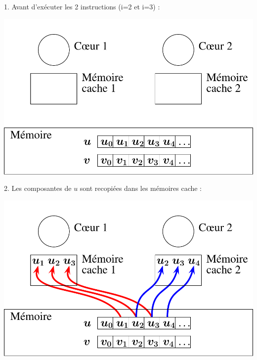 \documentclass{beamer}
\begin{document}
\begin{frame}
	\parbox[t][1cm]{10cm}{1. Avant d'exécuter les 2 instructions (i=2 et i=3) :}
   \begin{center}
   \includegraphics[scale=0.6]{../../Images/multithread0}
   \end{center}
\end{frame}

\begin{frame}
	\parbox[t][1cm]{10cm}{2. Les composantes de $u$ sont recopiées dans les mémoires cache :}
   \begin{center}
	\includegraphics[scale=0.6]{../../Images/multithread1}
   \end{center}
\end{frame}
\end{document}
